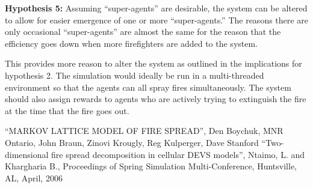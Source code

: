\documentclass{article}
\begin{document}
\begin{description}
    \item \textbf{Hypothesis 5:}
      Assuming ``super-agents'' are desirable, the system can be altered to
      allow for easier emergence of one or more ``super-agents.'' The reasons
      there are only occasional ``super-agents'' are almost the same for the
      reason that the efficiency goes down when more firefighters are added
      to the system.

      This provides more reason to alter the system as outlined in the
      implications for hypothesis 2. The simulation would ideally be run in a
      multi-threaded environment so that the agents can all spray fires
      simultaneously. The system should also assign rewards to agents who are
      actively trying to extinguish the fire at the time that the fire goes out.

  \end{description}

\begin{thebibliography}{1}
  ``MARKOV LATTICE MODEL OF FIRE SPREAD'', Den Boychuk, MNR Ontario,
  John Braun, Zinovi Krougly, Reg Kulperger, Dave Stanford
  ``Two-dimensional fire spread decomposition in cellular DEVS models'', Ntaimo,
  L. and Khargharia B., Proceedings of Spring Simulation Multi-Conference,
  Huntsville, AL, April, 2006
\end{thebibliography}
\end{document}

